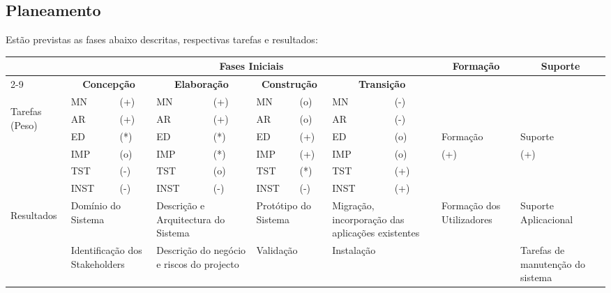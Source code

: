 \subsection{Planeamento}
Estão previstas as fases abaixo descritas, respectivas tarefas e resultados:
\begin{sidewaystable}[!p]
\begin{center}
\setlength{\tabcolsep}{5pt}
\begin{tabular}{|p{1cm}|p{1.2cm}|p{1.2cm}|p{1.2cm}|p{1.2cm}|p{1.2cm}|p{1.2cm}|p{1.2cm}|p{1.2cm}|p{2.4cm}|p{2.4cm}|}
\hline & \multicolumn{8}{|c|}{\T \B \textbf{Fases Iniciais}} & \multicolumn{1}{|c|}{\textbf{Formação}} & \multicolumn{1}{|c|}{\textbf{Suporte}}\\
\cline{2-9} & \multicolumn{2}{|c|}{\T \B \textbf{Concepção}} & \multicolumn{2}{|c|}{\textbf{Elaboração}} & \multicolumn{2}{|c|}{\textbf{Construção}} & \multicolumn{2}{|c|}{\textbf{Transição}} & \multicolumn{1}{|c|}{\textbf{ }} & \multicolumn{1}{|c|}{\textbf{ }}\\
\hline \multirow{6}{3cm}{\begin{sideways}\T \B \parbox{3cm}{Tarefas (Peso)}\end{sideways}} & MN & (+) & MN & (+) & MN & (o) & MN & (-) & & \\
\cline{2-9} & AR & (+) & AR & (+) & AR & (o) & AR & (-) & & \\
\cline{2-9} & ED & (*) & ED & (*) & ED & (+) & ED & (o) & Formação & Suporte \\
\cline{2-9} & IMP & (o) & IMP & (*) & IMP & (+) & IMP & (o) & (+) & (+)\\
\cline{2-9} & TST & (-) & TST & (o) & TST & (*) & TST & (+) & & \\
\cline{2-9} & INST & (-) & INST & (-) & INST & (-) & INST & (+) & & \\
\hline \multirow{5}{3cm}{\begin{sideways}\T \B \parbox{3cm}{Resultados}\end{sideways}} & \multicolumn{2}{|p{2cm}|}{Domínio do Sistema} & \multicolumn{2}{|p{2cm}|}{Descrição e Arquitectura do Sistema} & \multicolumn{2}{|p{2cm}|}{Protótipo do Sistema} & \multicolumn{2}{|p{2cm}|}{Migração, incorporação das aplicações existentes} & Formação dos Utilizadores & Suporte Aplicacional\\
\cline{2-11}\T \B & \multicolumn{2}{|p{2cm}|}{Identificação dos Stakeholders} & \multicolumn{2}{|p{2cm}|}{Descrição do negócio e riscos do projecto} & \multicolumn{2}{|p{2cm}|}{Validação} & \multicolumn{2}{|p{2cm}|}{Instalação} &  & Tarefas de manutenção do sistema\\

\end{tabular}
\end{center}
\end{sidewaystable}
